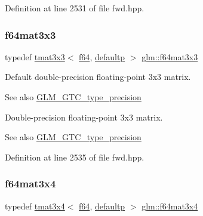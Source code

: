 Definition at line 2531 of file fwd.\+hpp.

\mbox{\label{group__gtc__type__precision_gab272e67eb87cc1e8233237480c2aa8d2}} 
\subsubsection{\texorpdfstring{f64mat3x3}{f64mat3x3}}
{\footnotesize\ttfamily typedef \mbox{\hyperlink{structglm_1_1tmat3x3}{tmat3x3}}$<$ \mbox{\hyperlink{group__gtc__type__precision_ga2bba392e555124b36cde6abba349bab3}{f64}}, \mbox{\hyperlink{namespaceglm_a0f04f086094c747d227af4425893f545a9d21ccd8b5a009ec7eb7677befc3bf51}{defaultp}} $>$ \mbox{\hyperlink{group__gtc__type__precision_gab272e67eb87cc1e8233237480c2aa8d2}{glm\+::f64mat3x3}}}

Default double-\/precision floating-\/point 3x3 matrix. \begin{DoxySeeAlso}{See also}
\mbox{\hyperlink{group__gtc__type__precision}{G\+L\+M\+\_\+\+G\+T\+C\+\_\+type\+\_\+precision}}
\end{DoxySeeAlso}
Double-\/precision floating-\/point 3x3 matrix. \begin{DoxySeeAlso}{See also}
\mbox{\hyperlink{group__gtc__type__precision}{G\+L\+M\+\_\+\+G\+T\+C\+\_\+type\+\_\+precision}} 
\end{DoxySeeAlso}


Definition at line 2535 of file fwd.\+hpp.

\mbox{\label{group__gtc__type__precision_ga36436dae85fc187d4a20d68c4d660a10}} 
\subsubsection{\texorpdfstring{f64mat3x4}{f64mat3x4}}
{\footnotesize\ttfamily typedef \mbox{\hyperlink{structglm_1_1tmat3x4}{tmat3x4}}$<$ \mbox{\hyperlink{group__gtc__type__precision_ga2bba392e555124b36cde6abba349bab3}{f64}}, \mbox{\hyperlink{namespaceglm_a0f04f086094c747d227af4425893f545a9d21ccd8b5a009ec7eb7677befc3bf51}{defaultp}} $>$ \mbox{\hyperlink{group__gtc__type__precision_ga36436dae85fc187d4a20d68c4d660a10}{glm\+::f64mat3x4}}}

